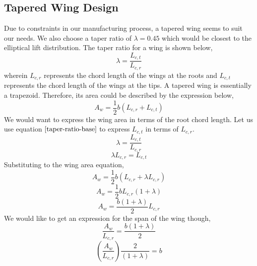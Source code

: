 \subsection{Tapered Wing Design}
\begin{comment}
\end{comment}
Due to constraints in our manufacturing process, a tapered wing seems to suit our needs. We also choose a taper ratio of $\lambda = 0.45$ which would be closest to the elliptical lift distribution. The taper ratio for a wing is shown below,
\begin{equation}\lambda = \frac{L_{c,t}}{L_{c,r}} \label{taper-ratio-base}\end{equation}
wherein $L_{c,r}$ represents the chord length of the wings at the roots and $L_{c,t}$ represents the chord length of the wings at the tips. A tapered wing is essentially a trapezoid. Therefore, its area could be described by the expression below,
$$A_{w} = \frac{1}{2}b(L_{c,r} + L_{c,t})$$
We would want to express the wing area in terms of the root chord length. Let us use equation $\ref{taper-ratio-base}$ to express $L_{c,t}$ in terms of $L_{c,r}$.
$$\lambda = \frac{L_{c,t}}{L_{c,r}}$$
$$\lambda L_{c,r} = L_{c,t}$$
Substituting to the wing area equation,
$$A_{w} = \frac{1}{2}b(L_{c,r} + \lambda L_{c,r})$$
$$A_{w} = \frac{1}{2}b L_{c,r}(1 + \lambda )$$
$$A_{w} = \frac{b(1 + \lambda )}{2} L_{c,r}$$
We would like to get an expression for the span of the wing though,
$$\frac{A_{w}}{L_{c,r}} = \frac{b(1 + \lambda )}{2}$$
\begin{equation}\left(\frac{A_{w}}{L_{c,r}}\right)\frac{2}{(1 + \lambda )} = b \label{Span from Area}\end{equation}

